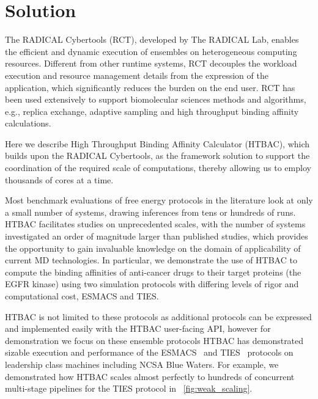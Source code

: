 \documentclass[conference]{IEEEtran}
\begin{document}
\section{Solution}\label{sec:solution}


The RADICAL Cybertools (RCT), developed by The RADICAL Lab, enables the
efficient and dynamic execution of ensembles on heterogeneous computing
resources. Different from other runtime systems, RCT decouples the workload
execution and resource management details from the expression of the
application, which significantly reduces the burden on the end user.
RCT has been used extensively to support
biomolecular sciences methods and algorithms, e.g., replica exchange, adaptive
sampling and high throughput binding affinity calculations.

Here we describe High Throughput Binding Affinity Calculator (HTBAC),
which builds upon the RADICAL Cybertools, as the framework solution to support
the coordination of the required scale of computations, thereby
allowing us to employ thousands of cores at a time.

Most benchmark evaluations of free energy protocols in the literature look
at only a small number of systems, drawing inferences from tens or hundreds
of runs. HTBAC facilitates studies on unprecedented scales, with the number
of systems investigated an order of magnitude larger than published studies,
which provides the opportunity to gain invaluable knowledge on the domain of
applicability of current MD technologies. In particular, we demonstrate the
use of HTBAC to compute the binding affinities of anti-cancer drugs to their
target proteins (the EGFR kinase) using two simulation protocols with differing
levels of rigor and computational cost, ESMACS and TIES.

HTBAC is not limited to these protocols as additional protocols can be
expressed and implemented easily with the HTBAC user-facing API, however for
demonstration we focus on these ensemble protocols HTBAC has demonstrated
sizable execution and performance of the ESMACS~\cite{dakka2017} and TIES~\cite{dakka_farkaspall} protocols on leadership
class machines including NCSA Blue Waters. For example, we demonstrated how HTBAC
scales almost perfectly to hundreds of concurrent multi-stage pipelines for the TIES 
protocol in ~\ref{fig:weak_scaling}.
\end{document}
